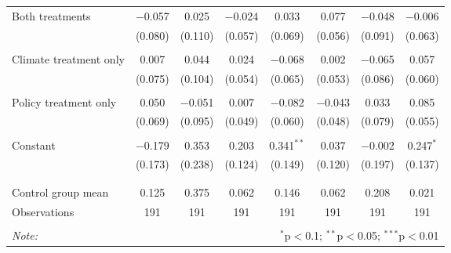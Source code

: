 \begin{tabular}{@{\extracolsep{5pt}}lccccccc}
 Both treatments & $-$0.057 & 0.025 & $-$0.024 & 0.033 & 0.077 & $-$0.048 & $-$0.006 \\ 
  & (0.080) & (0.110) & (0.057) & (0.069) & (0.056) & (0.091) & (0.063) \\ 
  & & & & & & & \\ 
 Climate treatment only & 0.007 & 0.044 & 0.024 & $-$0.068 & 0.002 & $-$0.065 & 0.057 \\ 
  & (0.075) & (0.104) & (0.054) & (0.065) & (0.053) & (0.086) & (0.060) \\ 
  & & & & & & & \\ 
 Policy treatment only & 0.050 & $-$0.051 & 0.007 & $-$0.082 & $-$0.043 & 0.033 & 0.085 \\ 
  & (0.069) & (0.095) & (0.049) & (0.060) & (0.048) & (0.079) & (0.055) \\ 
  & & & & & & & \\ 
 Constant & $-$0.179 & 0.353 & 0.203 & 0.341$^{**}$ & 0.037 & $-$0.002 & 0.247$^{*}$ \\ 
  & (0.173) & (0.238) & (0.124) & (0.149) & (0.120) & (0.197) & (0.137) \\ 
  & & & & & & & \\ 
\hline \\[-1.8ex] 
Control group mean & 0.125 & 0.375 & 0.062 & 0.146 & 0.062 & 0.208 & 0.021 \\ 
Observations & 191 & 191 & 191 & 191 & 191 & 191 & 191 \\ 
\hline 
\hline \\[-1.8ex] 
\textit{Note:}  & \multicolumn{7}{r}{$^{*}$p$<$0.1; $^{**}$p$<$0.05; $^{***}$p$<$0.01} \\ 
\end{tabular} 
